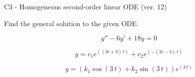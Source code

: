\begin{exercise}
  \begin{exerciseTitle}C3 - Homogeneous second-order linear ODE (ver. 12)\end{exerciseTitle}
  \begin{exerciseStatement}
    
Find the general solution to the given ODE.

    
\[y''-6y'+18y = 0\]

  \end{exerciseStatement}
  \begin{exerciseAnswer}
    
\[y= c_{1} e^{\left(\left(3 i + 3\right) \, t\right)} + c_{2} e^{\left(-\left(3 i - 3\right) \, t\right)}\]

    
\[y= {\left(k_{1} \cos\left(3 \, t\right) + k_{2} \sin\left(3 \, t\right)\right)} e^{\left(3 \, t\right)}\]

  \end{exerciseAnswer}
\end{exercise}